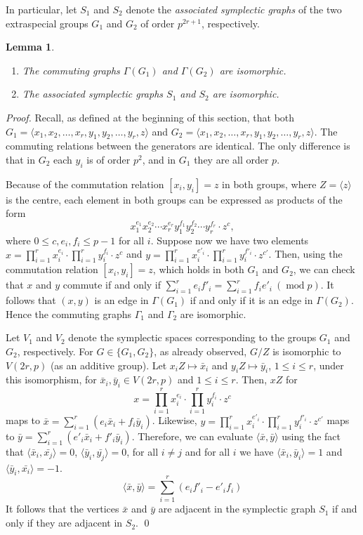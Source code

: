 \documentclass{elsarticle}
\newtheorem{lemma}[theorem]{Lemma}
\DeclareMathOperator{\Mod}{mod}
\renewcommand{\angle}[1]{\langle#1\rangle} %
\newcommand{\sympl}[1]{\langle #1 \rangle}
\begin{document}
In particular, let $S_1$ and $S_2$ denote the \emph{associated
  symplectic graphs} of the two extraspecial groups $G_1$
and $G_2$ of order $p^{2r+1}$, respectively.

\begin{lemma}\label{lem:iso}\hfill{~}
  \begin{enumerate}
  \item The commuting graphs $\Gamma(G_1)$ and $\Gamma(G_2)$
    are isomorphic.
  \item The associated symplectic graphs $S_1$ and $S_2$ are isomorphic.
\end{enumerate}
\end{lemma}

\begin{proof}
  Recall, as defined at the beginning of this section, that both
  $G_1=\angle{x_1,x_2,\ldots,x_r,y_1,y_2,\ldots,y_r,z}$ and
  $G_2=\angle{x_1,x_2,\ldots,x_r,y_1,y_2,\ldots,y_r,z}$. The commuting
  relations between the generators are identical. The only difference
  is that in $G_2$ each $y_i$ is of order $p^2$, and in $G_1$ they are
  all order $p$.

  Because of the commutation relation $[x_i,y_i]=z$ in both groups,
  where $Z=\angle{z}$ is the centre, each element in both groups
  can be expressed as products of the form
  \[
  x_1^{e_1}x_2^{e_2}\cdots x_r^{e_r}y_1^{f_1}y_2^{f_2}\cdots y_r^{f_r}\cdot z^c,
  \]
  where $0\le c,e_i,f_i\le p-1$ for all $i$. Suppose now we have two
  elements $x=\prod_{i=1}^r x_i^{e_i}\cdot \prod_{i=1}^r
  y_i^{f_i}\cdot z^c$ and $y=\prod_{i=1}^r x_i^{e'_i}\cdot
  \prod_{i=1}^r y_i^{f'_i}\cdot z^{c'}$.  Then, using the commutation
  relation $[x_i,y_i]=z$, which holds in both $G_1$ and $G_2$, we can
  check that $x$ and $y$ commute if and only if
  $\sum_{i=1}^re_if'_i=\sum_{i=1}^r f_ie'_i~(\Mod p)$. It follows that
  $(x,y)$ is an edge in $\Gamma(G_1)$ if and only if it is an edge in
  $\Gamma(G_2)$.  Hence the commuting graphs $\Gamma_1$ and $\Gamma_2$ are
isomorphic.

  Let $V_1$ and $V_2$ denote the symplectic spaces corresponding to
  the groups $G_1$ and $G_2$, respectively. For $G\in\{G_1,G_2\}$, as
  already observed, $G/Z$ is isomorphic to $V(2r,p)$ (as an additive
  group). Let $x_iZ\mapsto \bar{x}_i$ and $y_iZ\mapsto \bar{y}_i$,
  $1\le i\le r$, under this isomorphism, for $\bar{x}_i, \bar{y}_i\in
  V(2r,p)$ and $1\le i\le r$. Then, $xZ$ for
\[
  x=\prod_{i=1}^r
  x_i^{e_i}\cdot \prod_{i=1}^r y_i^{f_i}\cdot z^c
\]
maps to $\bar{x}=\sum_{i=1}^r(e_i\bar{x}_i+f_i\bar{y}_i)$. Likewise,
$y=\prod_{i=1}^r x_i^{e'_i}\cdot \prod_{i=1}^r y_i^{f'_i}\cdot z^{c'}$
maps to
$\bar{y}=\sum_{i=1}^r(e'_i\bar{x}_i+f'_i\bar{y}_i)$. Therefore, we can
evaluate $\sympl{\bar{x},\bar{y}}$ using the fact that
$\sympl{\bar{x}_i,\bar{x_j}}=0$, $\sympl{\bar{y}_i,\bar{y_j}}=0$, for
all $i\ne j$ and for all $i$ we have $\sympl{\bar{x}_i,\bar{y}_i}=1$
and $\sympl{\bar{y}_i,\bar{x_i}}=-1$.
  \[
  \sympl{\bar{x},\bar{y}}=\sum_{i=1}^r (e_if'_i - e'_if_i)
\]
It follows that the vertices $\bar{x}$ and $\bar{y}$ are adjacent in
the symplectic graph $S_1$ if and only if they are adjacent in $S_2$. \qed
\end{proof}
\end{document}
